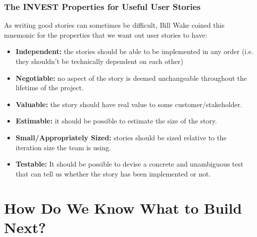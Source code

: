 \documentclass{article}
\begin{document}
\subsubsection{The INVEST Properties for Useful User Stories}
As writing good stories can sometimes be difficult, Bill Wake coined this mnemonic for the properties that we want out user stories to have:
\begin{itemize}
	\item \textbf{Independent:} the stories should be able to be implemented in any order (i.e. they shouldn't be technically dependent on each other)
	\item \textbf{Negotiable:} no aspect of the story is deemed unchangeable throughout the lifetime of the project.
	\item \textbf{Valuable:} the story should have real value to some customer/stakeholder.
	\item \textbf{Estimable:} it should be possible to estimate the size of the story.
	\item \textbf{Small/Appropriately Sized:} stories should be sized relative to the iteration size the team is using.
	\item \textbf{Testable:} It should be possible to devise a concrete and unambiguous test that can tell us whether the story has been implemented or not.
\end{itemize}

\section{How Do We Know What to Build Next?}
\end{document}
